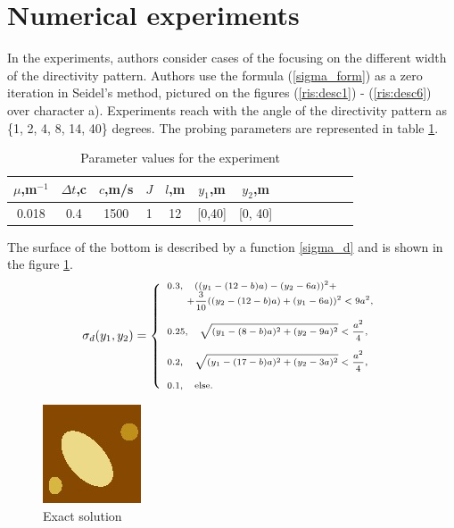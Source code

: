 \documentclass{procDDs}
\begin{document}
\section{Numerical experiments}
In the experiments, authors consider cases of the focusing on the different width of the directivity pattern. Authors use the formula (\ref{sigma_form}) as a zero iteration in Seidel's method, pictured on the figures (\ref{ris:desc1}) - (\ref{ris:desc6}) over character a). Experiments reach with the angle of the directivity pattern as  \{1, 2, 4, 8, 14, 40\} degrees. 
The probing parameters are represented in table \ref{table:name}.
\begin{table}[!ht]
	\begin{tabular}{|c|c|c|c|c|c|c|c|c|c|c|c|c|}
		\hline
			$\mu$,m$^{-1}$ & $\Delta t$,c & $c$,m/s & $J$ & $l$,m & $y_1$,m & $y_2$,m\\
			\hline
			0.018 & 0.4 & 1500 & 1 & 12 & [0,40] & [0, 40]\\ \hline
	\end{tabular}
	\label{table:name}
	\caption{Parameter values for the experiment}
\end{table}
The surface of the bottom is described by a function \ref{sigma_d} and is shown in the figure \ref{ris:dno}.
\begin{equation}
\scriptsize
	\label{sigma_d}
	\sigma_d(y_1, y_2) = 
	\left\{
	\begin{array}{ll}
		0.3 , \quad  ((y_1-(12-b)a)-(y_2-6a))^2+\\ \quad \quad +\dfrac{3}{10}((y_2-(12-b)a)+(y_1-6a))^2<9a^2,  \\ \\
		0.25, \quad \sqrt{(y_1-(8-b)a)^2+(y_2-9a)^2}<\dfrac{a^2}{4}, \\ \\
		0.2 ,\quad  \sqrt{(y_1-(17-b)a)^2+(y_2-3a)^2}<\dfrac{a^2}{4}, \\ \\
		0.1 , \quad \hbox{else.} \\
	\end{array}%
	\right.
\end{equation}
\begin{figure}[h!]\center
	
		\includegraphics[width=0.3\linewidth]{img/dno.jpg}
	\caption{Exact solution}
	\label{ris:dno}
\end{figure}
\end{document}
